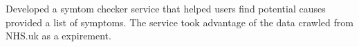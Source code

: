 \begin{cventry}
  \item Developed a symtom checker service that helped users find potential causes provided a list of symptoms. The service took advantage of the data crawled from NHS.uk as a expirement.
\end{cventry}
